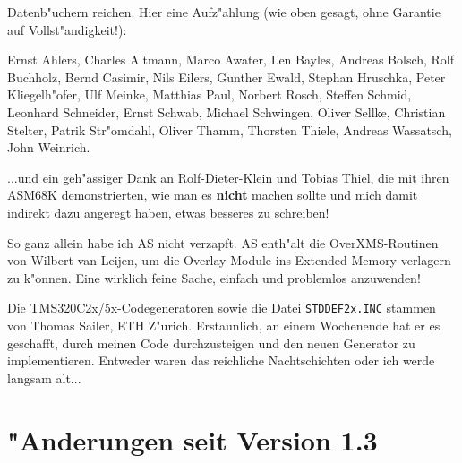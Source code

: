 \documentclass[12pt,a4paper,twoside]{report}
\newcommand{\bb}[1]{{\bf #1}}
\newcommand{\tty}[1]{{\tt #1}}
\begin{document}
Datenb"uchern reichen.  Hier eine Aufz"ahlung (wie oben gesagt, ohne
Garantie auf Vollst"andigkeit!):
\par
Ernst Ahlers, Charles Altmann, Marco Awater, Len Bayles, Andreas Bolsch,
Rolf Buchholz, Bernd Casimir, Nils Eilers, Gunther Ewald, Stephan Hruschka, Peter
Kliegelh"ofer, Ulf Meinke, Matthias Paul, Norbert Rosch, Steffen Schmid,
Leonhard Schneider, Ernst Schwab, Michael Schwingen, Oliver Sellke,
Christian Stelter, Patrik Str"omdahl, Oliver Thamm, Thorsten Thiele,
Andreas Wassatsch, John Weinrich.
\par
...und ein geh"assiger Dank an Rolf-Dieter-Klein und Tobias Thiel, die
mit ihren ASM68K demonstrierten, wie man es \bb{nicht} machen sollte und
mich damit indirekt dazu angeregt haben, etwas besseres zu schreiben!
\par
So ganz allein habe ich AS nicht verzapft.  AS enth"alt die
OverXMS-Routinen von Wilbert van Leijen, um die Overlay-Module ins
Extended Memory verlagern zu k"onnen.  Eine wirklich feine Sache,
einfach und problemlos anzuwenden!
\par
Die TMS320C2x/5x-Codegeneratoren sowie die Datei \tty{STDDEF2x.INC}
stammen von Thomas Sailer, ETH Z"urich.  Erstaunlich, an einem Wochenende
hat er es geschafft, durch meinen Code durchzusteigen und den neuen
Generator zu implementieren.  Entweder waren das reichliche Nachtschichten
oder ich werde langsam alt...


\cleardoublepage
\chapter{"Anderungen seit Version 1.3}
\end{document}
